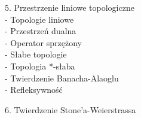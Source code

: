 \documentclass{article}
\begin{document}
5. Przestrzenie liniowe topologiczne\\
\indent - Topologie liniowe\\
\indent - Przestrzeń dualna\\
\indent - Operator sprzężony\\
\indent - Słabe topologie\\
\indent - Topologia *-słaba\\
\indent - Twierdzenie Banacha-Alaoglu\\
\indent - Refleksywność\smallskip

6. Twierdzenie Stone'a-Weierstrassa

\newpage

\tableofcontents

\newpage
\end{document}
